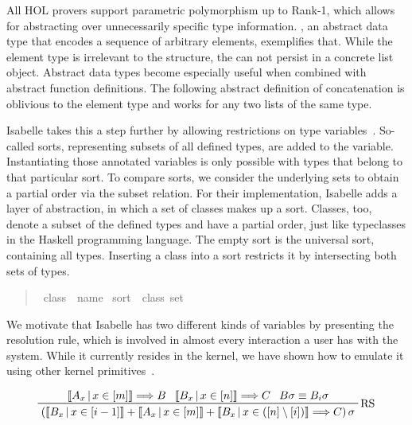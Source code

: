 All HOL provers support parametric polymorphism up to Rank-1, which allows for abstracting over unnecessarily specific type information.
, an abstract data type that encodes a sequence of arbitrary elements, exemplifies that.
While the element type is irrelevant to the structure, the  can not persist in a concrete list object.
Abstract data types become especially useful when combined with abstract function definitions.
The following abstract definition of concatenation is oblivious to the element type and works for any two lists of the same type.

Isabelle takes this a step further by allowing restrictions on type variables~\parencite{Nipkow93}.
So-called sorts, representing subsets of all defined types, are added to the variable.
Instantiating those annotated variables is only possible with types that belong to that particular sort.
To compare sorts, we consider the underlying sets to obtain a partial order via the subset relation.
For their implementation, Isabelle adds a layer of abstraction, in which a set of classes makes up a sort.
Classes, too, denote a subset of the defined types and have a partial order, just like typeclasses in the Haskell programming language.
The empty sort is the universal sort, containing all types.
Inserting a class into a sort restricts it by intersecting both sets of types.

\begin{quote}
    \begin{isabelle}
        \ class\ {\isacharequal}\ name \isanewline
        \ sort\ {\isacharequal}\ class\ set
    \end{isabelle}
\end{quote}

We motivate that Isabelle has two different kinds of variables by presenting the resolution rule, which is involved in almost every interaction a user has with the system.
While it currently resides in the kernel, we have shown how to emulate it using other kernel primitives~\parencite{Madge17}.

\begin{displaymath}
    \prftree[r]{RS}
    {\left\llbracket A_x\,\middle|\, x \in \left[ m \right] \right\rrbracket \Longrightarrow B}
    {\left\llbracket B_x\,\middle|\, x \in \left[ n \right] \right\rrbracket \Longrightarrow C}
    {B\sigma \equiv B_i\sigma}
    {\left( \left\llbracket B_x\,\middle|\, x \in \left[ i - 1 \right] \right\rrbracket
        + \left\llbracket A_x\,\middle|\, x \in \left[ m \right] \right\rrbracket
        + \left\llbracket B_x\,\middle|\, x \in \left( \left[ n \right] \setminus \left[ i \right] \right) \right\rrbracket
        \Longrightarrow C \right) \sigma
    }
\end{displaymath}

